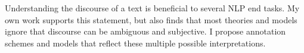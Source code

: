 Understanding the discourse of a text is beneficial to several NLP end tasks. My own work supports this statement, but also finds that most theories and models ignore that discourse can be ambiguous and subjective. I propose annotation schemes and models that reflect these multiple possible interpretations. 

